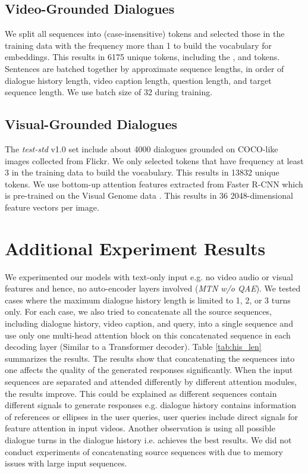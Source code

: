\documentclass[11pt,a4paper]{article}
\begin{document}
\subsection{Video-Grounded Dialogues}
\label{app:data_preprocessing_video}
We split all sequences into (case-insensitive) tokens and selected those in the training data with the frequency more than 1 to build the vocabulary for embeddings. This results in 6175 unique tokens, including the , and  tokens. 
Sentences are batched together by approximate sequence lengths, in order of dialogue history length, video caption length, question length, and target sequence length. We use batch size of 32 during training. 

\subsection{Visual-Grounded Dialogues}
\label{app:data_preprocessing_visual}
The \textit{test-std} v1.0 set include about 4000 dialogues grounded on COCO-like images collected from Flickr. We only selected tokens that have frequency at least 3 in the training data to build the vocabulary. This results in 13832 unique tokens. We use bottom-up attention features \cite{anderson2018bottom} extracted from Faster R-CNN \cite{ren2015faster} which is pre-trained on the Visual Genome data \cite{krishna2017visual}. This results in 36 2048-dimensional feature vectors per image. 

\section{Additional Experiment Results}
\label{app:additional_results}
We experimented our models with text-only input e.g. no video audio or visual features and hence, no auto-encoder layers involved (\textit{MTN w/o QAE}). We tested cases where the maximum dialogue history length  is limited to 1, 2, or 3 turns only. For each case, we also tried to concatenate all the source sequences, including dialogue history, video caption, and query, into a single sequence and use only one multi-head attention block on this concatenated sequence in each decoding layer (Similar to a Transformer decoder). Table \ref{tab:his_len} summarizes the results. The results show that concatenating the sequences into one affects the quality of the generated responses significantly. When the input sequences are separated and attended differently by different attention modules, the results improve. This could be explained as different sequences contain different signals to generate responses e.g. dialogue history contains information of references or ellipses in the user queries, user queries include direct signals for feature attention in input videos. 
Another observation is using all possible dialogue turns in the dialogue history i.e.  achieves the best results. We did not conduct experiments of concatenating source sequences with  due to memory issues with large input sequences. 
\end{document}
